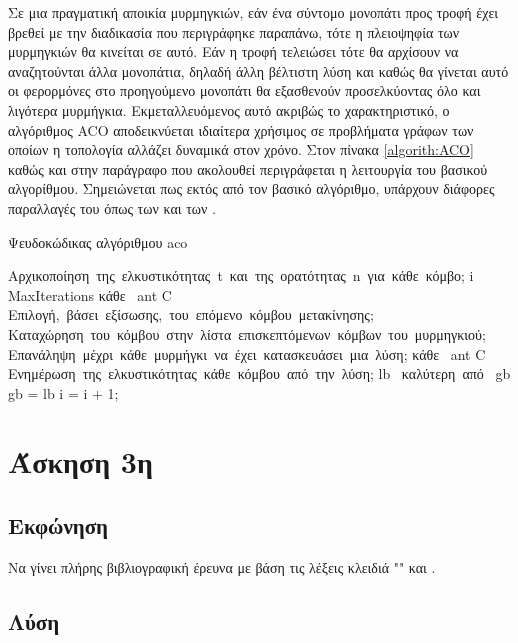 \documentclass{assignment}
\begin{document}
Σε μια πραγματική αποικία μυρμηγκιών, εάν ένα σύντομο μονοπάτι προς τροφή έχει
βρεθεί με την διαδικασία που περιγράφηκε παραπάνω, τότε η πλειοψηφία των
μυρμηγκιών θα κινείται σε αυτό. Εάν η τροφή τελειώσει τότε θα αρχίσουν να 
αναζητούνται άλλα μονοπάτια, δηλαδή άλλη βέλτιστη λύση και καθώς θα γίνεται
αυτό οι φερορμόνες στο προηγούμενο μονοπάτι θα εξασθενούν προσελκύοντας όλο και
λιγότερα μυρμήγκια. Εκμεταλλευόμενος αυτό ακριβώς το χαρακτηριστικό, ο
αλγόριθμος ACO αποδεικνύεται ιδιαίτερα χρήσιμος σε προβλήματα γράφων των οποίων
η τοπολογία αλλάζει δυναμικά στον χρόνο. Στον πίνακα \ref{algorith:ACO}
καθώς και στην παράγραφο που ακολουθεί περιγράφεται η λειτουργία του βασικού
αλγορίθμου. Σημειώνεται πως εκτός από τον βασικό αλγόριθμο, υπάρχουν διάφορες
παραλλαγές του όπως των \citet{merkle2002ant} και των \citet{yaseen2008ant}.
\begin{algorithm}                        %
\caption{Ψευδοκώδικας αλγόριθμου aco}          %
\label{algorith:ACO}                      %
\begin{program}
\mbox{Αρχικοποίηση της ελκυστικότητας t και της ορατότητας n για κάθε κόμβο};
  \WHILE i \lt MaxIterations \DO
    \FOR \mbox{κάθε } ant \in C \DO
    \mbox{Επιλογή, βάσει εξίσωσης, του επόμενο κόμβου μετακίνησης;}
    \mbox{Καταχώρηση του κόμβου στην λίστα επισκεπτόμενων κόμβων του μυρμηγκιού;}
    \mbox{Eπανάληψη μέχρι κάθε μυρμήγκι να έχει κατασκευάσει μια λύση;}
  \END
  \FOR \mbox{κάθε } ant \in C \DO
  \mbox{Ενημέρωση της ελκυστικότητας κάθε κόμβου από την λύση;}
  \END
  \IF lb \mbox{ καλύτερη από } gb
    \THEN gb = lb
   \FI
   i = i + 1;
  \END
\end{program}
\end{algorithm}

\section{Άσκηση 3η} 
\subsection{Εκφώνηση}

Να γίνει πλήρης βιβλιογραφική έρευνα με βάση τις λέξεις κλειδιά "" και .

\subsection {Λύση}
\end{document}
